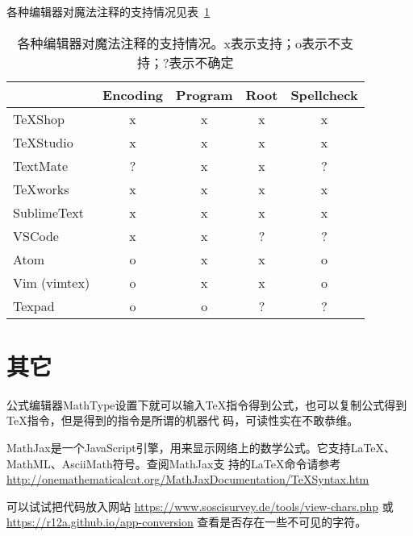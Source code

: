 各种编辑器对魔法注释的支持情况见表~\ref{magiccommands}
\begin{table}
  \centering
  \caption{各种编辑器对魔法注释的支持情况。x表示支持；o表示不支持；?表示不确定}\label{magiccommands}
  \begin{tabular}{|l|*{4}{c|}}
    \hline
    & Encoding & Program & Root & Spellcheck \\
    \hline
    TeXShop & x  & x & x & x \\
    \hline
    TeXStudio & x & x & x & x \\
    \hline
    TextMate & ? & x & x & ? \\
    \hline
    TeXworks & x & x & x & x \\
    \hline
    SublimeText  & x & x & x & x \\ 
    \hline
    VSCode & x & x & ? & ? \\
    \hline
    Atom & o & x & x & o \\
    \hline
    Vim
    (vimtex) & o & x & x & o \\ 
    \hline
    Texpad & o & o & ? & ? \\
    \hline
  \end{tabular}
\end{table}

\section{其它}




公式编辑器MathType设置下就可以输入TeX指令得到公式，也可以复制公式得到TeX指令，但是得到的指令是所谓的机器代
码，可读性实在不敢恭维。

MathJax是一个JavaScript引擎，用来显示网络上的数学公式。它支持LaTeX、MathML、AsciiMath符号。查阅MathJax支
持的LaTeX命令请参考 \url{http://onemathematicalcat.org/MathJaxDocumentation/TeXSyntax.htm}

可以试试把代码放入网站 \url{https://www.soscisurvey.de/tools/view-chars.php} 或 \url{https://r12a.github.io/app-conversion} 查看是否存在一些不可见的字符。
